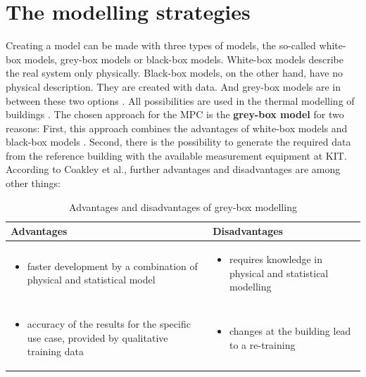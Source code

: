     \section{The modelling strategies}
    \label{ModellingStrategies}
    Creating a model can be made with three types of models, the so-called white-box models, grey-box models or black-box models. White-box models describe the real system only physically. Black-box models, on the other hand, have no physical description. They are created with data. And grey-box models are in between these two options \cite{Statusseminar.ForschungfurEnergieoptimiertesBauen.2009}. All possibilities are used in the thermal modelling of buildings \cite{Kramer.2012}.
    \newline
    The chosen approach for the MPC is the \textbf{grey-box model} for two reasons: First, this approach combines the advantages of white-box models and black-box models \cite{EstradaFlores.2006}. Second, there is the possibility to generate the required data from the reference building with the available measurement equipment at KIT. According to Coakley et al., further advantages and disadvantages are among other things\cite{Coakley.2014}:
    \begin{table}[h!]
    \label{Advantages and disadvantages of grey-box modelling}
        \centering
        \begin{tabular}{p{7.3cm} | p{7.3cm}}
        \hline
          Advantages  &  Disadvantages\\
        \hline
        \begin{itemize}
            \item faster development by a combination of physical and statistical model
        \end{itemize}
      & \begin{itemize}
            \item requires knowledge in physical and statistical modelling 
        \end{itemize}\\
     \begin{itemize}
            \item accuracy of the results for the specific use case, provided by qualitative training data
        \end{itemize} & \begin{itemize}
            \item changes at the building lead to a re-training
        \end{itemize}\\
        \end{tabular}
        \caption {Advantages and disadvantages of grey-box modelling}
    \end{table}
